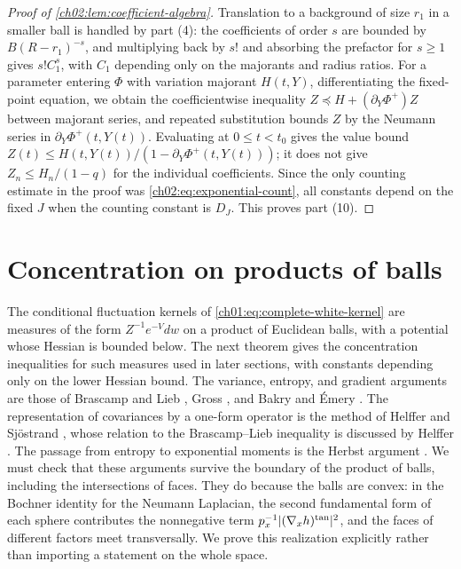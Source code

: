 \begin{proof}[Proof of \cref{ch02:lem:coefficient-algebra}]
Translation to a background of size $r_1$ in a smaller ball is handled by part (4): the coefficients of order $s$ are bounded by $B(R-r_1)^{-s}$, and multiplying back by $s!$ and absorbing the prefactor for $s\ge1$ gives $s!C_1^s$, with $C_1$ depending only on the majorants and radius ratios. For a parameter entering $\Phi$ with variation majorant $H(t,Y)$, differentiating the fixed-point equation, we obtain the coefficientwise inequality $Z\preceq H+(\partial_Y\Phi^+)Z$ between majorant series, and repeated substitution bounds $Z$ by the Neumann series in $\partial_Y\Phi^+(t,Y(t))$. Evaluating at $0\le t<t_0$ gives the value bound $Z(t)\le H(t,Y(t))/(1-\partial_Y\Phi^+(t,Y(t)))$; it does not give $Z_n\le H_n/(1-q)$ for the individual coefficients. Since the only counting estimate in the proof was \eqref{ch02:eq:exponential-count}, all constants depend on the fixed $J$ when the counting constant is $D_J$. This proves part (10).
\end{proof}

\section{Concentration on products of balls}\label{ch02:sec:concentration}

The conditional fluctuation kernels of \eqref{ch01:eq:complete-white-kernel} are measures of the form $Z^{-1}e^{-V}dw$ on a product of Euclidean balls, with a potential whose Hessian is bounded below. The next theorem gives the concentration inequalities for such measures used in later sections, with constants depending only on the lower Hessian bound. The variance, entropy, and gradient arguments are those of Brascamp and Lieb \cite{BrascampLieb1976}, Gross \cite{Gross1975}, and Bakry and Émery \cite{BakryEmery1985}. The representation of covariances by a one-form operator is the method of Helffer and Sjöstrand \cite{HelfferSjostrand1994}, whose relation to the Brascamp--Lieb inequality is discussed by Helffer \cite{Helffer1998}. The passage from entropy to exponential moments is the Herbst argument \cite[Section~2.3, Proposition~2.3, p.~149, and Corollary~2.4, p.~151]{Ledoux1999}. We must check that these arguments survive the boundary of the product of balls, including the intersections of faces. They do because the balls are convex: in the Bochner identity for the Neumann Laplacian, the second fundamental form of each sphere contributes the nonnegative term $p_x^{-1}\lvert (\nabla_xh)^{\mathrm{tan}}\rvert^2$, and the faces of different factors meet transversally. We prove this realization explicitly rather than importing a statement on the whole space.


